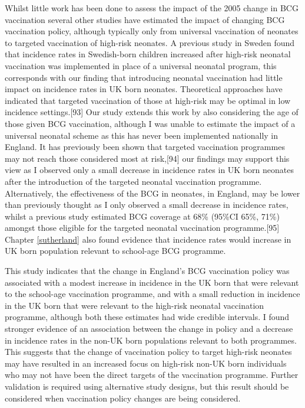 \documentclass[11pt,twoside]{bristolthesis}
\begin{document}
  Whilst little work has been done to assess the impact of the 2005 change in BCG vaccination several other studies have estimated the impact of changing BCG vaccination policy, although typically only from universal vaccination of neonates to targeted vaccination of high-risk neonates. A previous study in Sweden found that incidence rates in Swedish-born children increased after high-risk neonatal vaccination was implemented in place of a universal neonatal program, this corresponds with our finding that introducing neonatal vaccination had little impact on incidence rates in UK born neonates. Theoretical approaches have indicated that targeted vaccination of those at high-risk may be optimal in low incidence settings.{[}93{]} Our study extends this work by also considering the age of those given BCG vaccination, although I was unable to estimate the impact of a universal neonatal scheme as this has never been implemented nationally in England. It has previously been shown that targeted vaccination programmes may not reach those considered most at risk,{[}94{]} our findings may support this view as I observed only a small decrease in incidence rates in UK born neonates after the introduction of the targeted neonatal vaccination programme. Alternatively, the effectiveness of the BCG in neonates, in England, may be lower than previously thought as I only observed a small decrease in incidence rates, whilst a previous study estimated BCG coverage at 68\% (95\%CI 65\%, 71\%) amongst those eligible for the targeted neonatal vaccination programme.{[}95{]} Chapter \ref{sutherland} also found evidence that incidence rates would increase in UK born population relevant to school-age BCG programme.
  
  This study indicates that the change in England's BCG vaccination policy was associated with a modest increase in incidence in the UK born that were relevant to the school-age vaccination programme, and with a small reduction in incidence in the UK born that were relevant to the high-risk neonatal vaccination programme, although both these estimates had wide credible intervals. I found stronger evidence of an association between the change in policy and a decrease in incidence rates in the non-UK born populations relevant to both programmes. This suggests that the change of vaccination policy to target high-risk neonates may have resulted in an increased focus on high-risk non-UK born individuals who may not have been the direct targets of the vaccination programme. Further validation is required using alternative study designs, but this result should be considered when vaccination policy changes are being considered.
  
\end{document}
